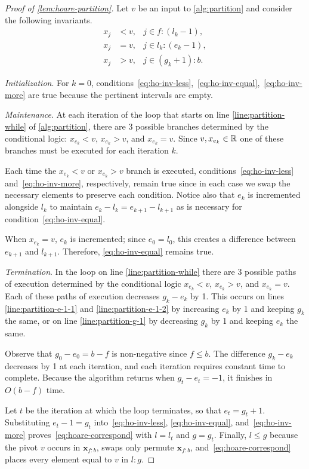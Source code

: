 \begin{proof}[Proof of \cref{lem:hoare-partition}]
Let $v$ be an input to \cref{alg:partition} and consider the following invariants.
\begin{align}
\label{eq:ho-inv-less}   x_j &< v, & j\in f{:}(l_k-1), \\
\label{eq:ho-inv-equal}  x_j &= v, & j \in l_k{:}(e_k-1), \\
\label{eq:ho-inv-more}   x_j &> v, & j \in (g_k+1){:}b.
\end{align}
  
\emph{Initialization}. For $k=0$, conditions~\eqref{eq:ho-inv-less},~\eqref{eq:ho-inv-equal},~\eqref{eq:ho-inv-more} are true because the pertinent intervals are empty. 
  
\emph{Maintenance}. At each iteration of the loop that starts on line \ref{line:partition-while} of \cref{alg:partition}, there are 3 possible branches determined by the conditional logic: $x_{e_k} < v$, $x_{e_k} > v$, and $x_{e_k} = v$. Since $v, x_{e_k} \in \mathbb{R}$ one of these branches must be executed for each iteration $k$.

Each time the $x_{e_k} < v$ or $x_{e_k} > v$ branch is executed, conditions~\eqref{eq:ho-inv-less} and~\eqref{eq:ho-inv-more}, respectively, remain true since in each case we swap the necessary elements to preserve each condition. Notice also that $e_k$ is incremented alongside $l_k$ to maintain $e_k - l_k = e_{k+1} - l_{k+1}$ as is necessary for condition~\eqref{eq:ho-inv-equal}.

When $x_{e_k} = v$, $e_k$ is incremented; since $e_0 = l_0$, this creates a difference between $e_{k+1}$ and $l_{k+1}$. Therefore, \eqref{eq:ho-inv-equal} remains true.   
  
\emph{Termination}. In the loop on line \ref{line:partition-while} there are 3 possible paths of execution determined by the conditional logic $x_{e_k} < v$, $x_{e_k} > v$, and $x_{e_k} = v$. Each of these paths of execution decreases $g_k - e_k$ by 1. This occurs on lines \ref{line:partition-e-1-1} and \ref{line:partition-e-1-2} by increasing $e_k$ by 1 and keeping $g_k$ the same, or on line \ref{line:partition-g-1} by decreasing $g_k$ by 1 and keeping $e_k$ the same.
  
Observe that  $g_0 - e_0 = b - f$ is non-negative since $f\le b$. The difference $g_k-e_k$ decreases by 1 at each iteration, and each iteration requires constant time to complete. Because the algorithm returns when $g_t - e_t = -1$, it finishes in $O(b-f)$ time.

Let $t$ be the iteration at which the loop terminates, so that $e_t = g_t + 1$. Substituting $e_t - 1 = g_t$ into~\eqref{eq:ho-inv-less}, \eqref{eq:ho-inv-equal}, and~\eqref{eq:ho-inv-more} proves~\eqref{eq:hoare-correspond} with $l = l_t$ and $g = g_t$. Finally, $l \le g$ because the pivot $v$ occurs in $\bm{x}_{f:b}$, swaps only permute $\bm{x}_{f:b}$, and~\eqref{eq:hoare-correspond} places every element equal to $v$ in $l{:}g$.
\end{proof}


